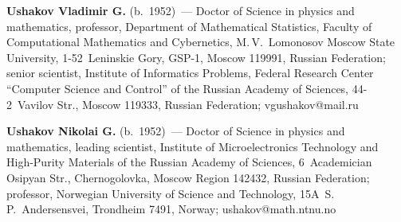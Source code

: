 
\vspace*{-12pt}     

\Contr

\noindent
\textbf{Ushakov Vladimir G.} (b.\ 1952)~--- 
Doctor of Science in physics and mathematics, professor, Department of Mathematical Statistics, 
Faculty of Computational Mathematics and Cybernetics, M.\,V.~Lomonosov Moscow State University, 
1-52~Leninskie Gory, GSP-1, Moscow 119991, Russian Federation; senior scientist, Institute of
 Informatics Problems, Federal Research Center ``Computer Science and Control'' of the Russian
  Academy of Sciences, 44-2~Vavilov Str., Moscow 119333, Russian Federation; \mbox{vgushakov@mail.ru}
  
  \vspace*{3pt}
  
  \noindent
  \textbf{Ushakov Nikolai G.} (b.\ 1952)~--- Doctor of Science
   in physics and mathematics, leading scientist, Institute of Microelectronics Technology and 
   High-Purity Materials of the Russian Academy of Sciences, 6~Academician Osipyan Str., 
   Chernogolovka, Moscow Region 142432, Russian Federation; professor, Norwegian
    University of Science and Technology, 15A~S.\,P.~Andersensvei, Trondheim 7491, Norway; 
    \mbox{ushakov@math.ntnu.no}



     
\label{end\stat}

\renewcommand{\bibname}{\protect\rm Литература}